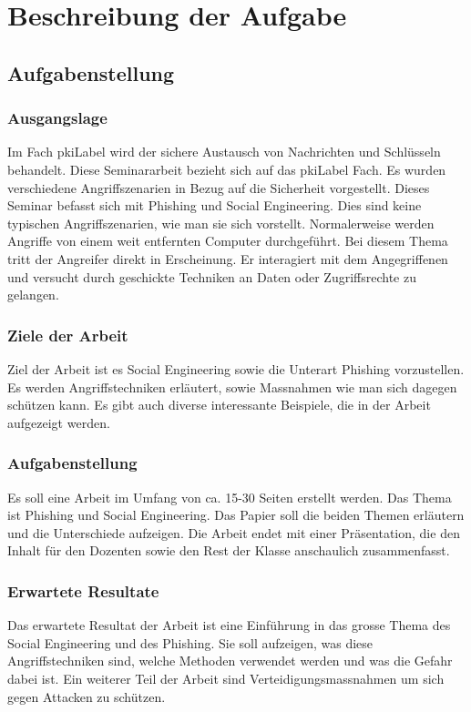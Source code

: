 \chapter{Beschreibung der Aufgabe}

\section{Aufgabenstellung}

\subsection{Ausgangslage}
Im Fach \Gls{pkiLabel} wird der sichere Austausch von Nachrichten und Schlüsseln behandelt. Diese Seminararbeit bezieht sich auf das \Gls{pkiLabel} Fach. Es wurden verschiedene Angriffszenarien in Bezug auf die Sicherheit vorgestellt. Dieses Seminar befasst sich mit Phishing und Social Engineering.
Dies sind keine typischen Angriffszenarien, wie man sie sich vorstellt. Normalerweise werden Angriffe von einem weit entfernten Computer durchgeführt. Bei diesem Thema tritt der Angreifer direkt in Erscheinung. Er interagiert mit dem Angegriffenen und versucht durch geschickte Techniken an Daten oder Zugriffsrechte zu gelangen. 

\subsection{Ziele der Arbeit}
Ziel der Arbeit ist es Social Engineering sowie die Unterart Phishing vorzustellen. Es werden Angriffstechniken erläutert, sowie Massnahmen wie man sich dagegen schützen kann. Es gibt auch diverse interessante Beispiele, die in der Arbeit aufgezeigt werden. 

\subsection{Aufgabenstellung}
Es soll eine Arbeit im Umfang von ca. 15-30 Seiten erstellt werden. Das Thema ist Phishing und Social Engineering. Das Papier soll die beiden Themen erläutern und die Unterschiede aufzeigen.
Die Arbeit endet mit einer Präsentation, die den Inhalt für den Dozenten sowie den Rest der Klasse anschaulich zusammenfasst.

\subsection{Erwartete Resultate}
Das erwartete Resultat der Arbeit ist eine Einführung in das grosse Thema des Social Engineering und des Phishing. Sie soll aufzeigen, was diese Angriffstechniken sind, welche Methoden verwendet werden und was die Gefahr dabei ist. Ein weiterer Teil der Arbeit sind Verteidigungsmassnahmen um sich gegen Attacken zu schützen.